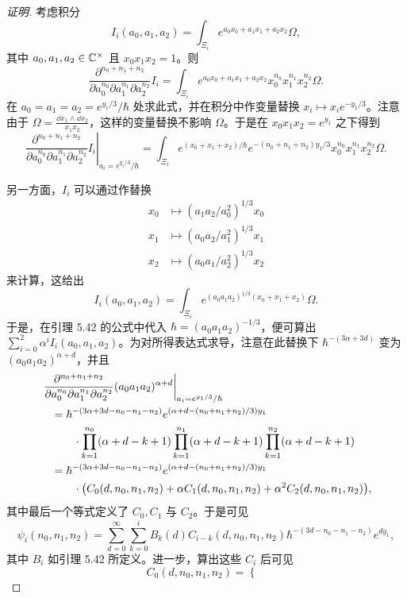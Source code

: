 \begin{proof}[证明]
考虑积分
\[
  I_i(a_0,a_1,a_2)=\int_{\Xi_i}e^{a_0x_0+a_1x_1+a_2x_2}\Omega,
\]
其中 $a_0,a_1,a_2\in\mathbb{C}^\times$ 且 $x_0x_1x_2=1$。则
\[
  \frac{\partial^{n_0+n_1+n_2}}{\partial a_0^{n_0}\partial a_1^{n_1}\partial a_2^{n_2}}I_i
  =\int_{\Xi_i}e^{a_0x_0+a_1x_1+a_2x_2}x_0^{n_0}x_1^{n_1}x_2^{n_2}\Omega.
\]
在 $a_0=a_1=a_2=e^{y_1/3}/\hbar$ 处求此式，并在积分中作变量替换 $x_i\mapsto x_ie^{-y_1/3}$。注意由于 $\Omega=\frac{\dd x_1\wedge\dd x_2}{x_1x_2}$，这样的变量替换不影响 $\Omega$。于是在 $x_0x_1x_2=e^{y_1}$ 之下得到
\[
  \left.\frac{\partial^{n_0+n_1+n_2}}{\partial a_0^{n_0}\partial a_1^{n_1}\partial a_2^{n_2}}I_i\right|_{a_i=e^{y_1/3}/\hbar}
  =\int_{\Xi_i}e^{(x_0+x_1+x_2)/\hbar}e^{-(n_0+n_1+n_2)y_1/3}x_0^{n_0}x_1^{n_1}x_2^{n_2}\Omega.
\]

另一方面，$I_i$ 可以通过作替换
\begin{align*}
  x_0&\mapsto (a_1a_2/a_0^2)^{1/3}x_0\\
  x_1&\mapsto (a_0a_2/a_1^2)^{1/3}x_1\\
  x_2&\mapsto (a_0a_1/a_2^2)^{1/3}x_2
\end{align*}
来计算，这给出
\[
  I_i(a_0,a_1,a_2)=\int_{\Xi_i}e^{(a_0a_1a_2)^{1/3}(x_0+x_1+x_2)}\Omega.
\]
于是，在引理 5.42 的公式中代入 $\hbar=(a_0a_1a_2)^{-1/3}$，便可算出 $\sum_{i=0}^2\alpha^iI_i(a_0,a_1,a_2)$。为对所得表达式求导，注意在此替换下 $\hbar^{-(3\alpha+3d)}$ 变为 $(a_0a_1a_2)^{\alpha+d}$，并且
\begin{align}
  &\left.\frac{\partial^{n_0+n_1+n_2}}{\partial a_0^{n_0}\partial a_1^{n_1}\partial a_2^{n_2}}(a_0a_1a_2)^{\alpha+d}\right|_{a_i=e^{y_1/3}/\hbar} \notag\\
  &\quad =\hbar^{-(3\alpha+3d-n_0-n_1-n_2)}e^{(\alpha+d-(n_0+n_1+n_2)/3)y_1} \notag\\
  &\quad\qquad\cdot\prod_{k=1}^{n_0}(\alpha+d-k+1)\prod_{k=1}^{n_1}(\alpha+d-k+1)\prod_{k=1}^{n_2}(\alpha+d-k+1) \notag\\
  &\quad =\hbar^{-(3\alpha+3d-n_0-n_1-n_2)}e^{(\alpha+d-(n_0+n_1+n_2)/3)y_1} \notag\\
  &\quad\qquad\cdot\bigl(C_0(d,n_0,n_1,n_2)+\alpha C_1(d,n_0,n_1,n_2)+\alpha^2C_2(d,n_0,n_1,n_2)\bigr),
\end{align}
其中最后一个等式定义了 $C_0,C_1$ 与 $C_2$。于是可见
\[
  \psi_i(n_0,n_1,n_2)=\sum_{d=0}^{\infty}\sum_{k=0}^{i}B_k(d)C_{i-k}(d,n_0,n_1,n_2)\hbar^{-(3d-n_0-n_1-n_2)}e^{dy_1},
\]
其中 $B_i$ 如引理 5.42 所定义。进一步，算出这些 $C_i$ 后可见
\[
  C_0(d,n_0,n_1,n_2)=
  \begin{cases}

\end{cases}\]
\end{proof}
